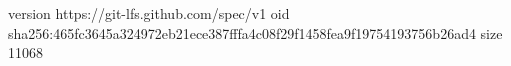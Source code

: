 version https://git-lfs.github.com/spec/v1
oid sha256:465fc3645a324972eb21ece387fffa4c08f29f1458fea9f19754193756b26ad4
size 11068
